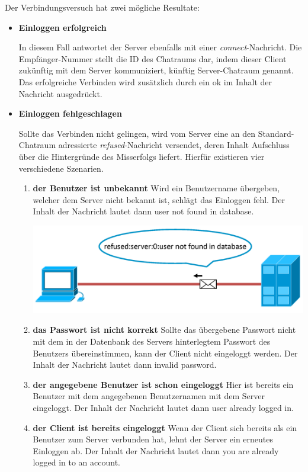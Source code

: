 \documentclass[12pt,a4paper,bibliography=totocnumbered,listof=totocnumbered]{scrartcl}
\begin{document}
Der Verbindungsversuch hat zwei mögliche Resultate:
\begin{itemize}
	\item \textbf{Einloggen erfolgreich}
	
	In diesem Fall antwortet der Server ebenfalls mit einer \textit{connect}-Nachricht. Die Empfänger-Nummer stellt die ID des Chatraums dar, indem dieser Client zukünftig mit dem Server kommuniziert, künftig Server-Chatraum genannt. Das erfolgreiche Verbinden wird zusätzlich durch ein \glqq ok\grqq{} im Inhalt der Nachricht ausgedrückt.
	\item \textbf{Einloggen fehlgeschlagen}
	
	Sollte das Verbinden nicht gelingen, wird vom Server eine an den Standard-Chatraum adressierte \textit{refused}-Nachricht versendet, deren Inhalt Aufschluss über die Hintergründe des Misserfolgs liefert. Hierfür existieren vier verschiedene Szenarien.
	\begin{enumerate}
		\item \textbf{der Benutzer ist unbekannt} \newline
			Wird ein Benutzername übergeben, welcher dem Server nicht bekannt ist, schlägt das Einloggen fehl. Der Inhalt der Nachricht lautet dann \glqq user not found in database\grqq{}.
			
			\vspace{1em}
			\begin{minipage}{\linewidth}
				\centering
				\includegraphics[width=0.7\linewidth]{img/connect2.png}
				\label{fig:connect2}
			\end{minipage} 	
		\item \textbf{das Passwort ist nicht korrekt} \newline
			Sollte das übergebene Passwort nicht mit dem in der Datenbank des Servers hinterlegtem Passwort des Benutzers übereinstimmen, kann der Client nicht eingeloggt werden. Der Inhalt der Nachricht lautet dann \glqq invalid password\grqq{}.
		\item \textbf{der angegebene Benutzer ist schon eingeloggt} \newline
			Hier ist bereits ein Benutzer mit dem angegebenen Benutzernamen mit dem Server eingeloggt. Der Inhalt der Nachricht lautet dann \glqq user already logged in\grqq.
		\item \textbf{der Client ist bereits eingeloggt} \newline
		    Wenn der Client sich bereits als ein Benutzer zum Server verbunden hat, lehnt der Server ein erneutes Einloggen ab. Der Inhalt der Nachricht lautet dann \glqq you are already logged in to an account\grqq.
	\end{enumerate}
	
	
\end{itemize}
\end{document}
